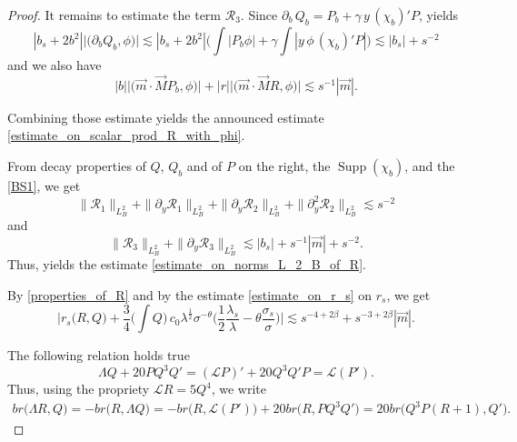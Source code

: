 \documentclass[16pt,english, oneside,reqno]{smfart}
\DeclareMathOperator{\supp}{Supp}
\begin{document}
\begin{proof}
It remains to estimate the term $\mathcal{R}_3$. Since $\partial_b \, Q_b = P_b + \gamma \, y \, (\chi_b)' P$, yields
\begin{equation}
    |b_s + 2b^2| \big\lvert \big( \partial_b Q_b, \phi \big) \big\rvert \lesssim |b_s + 2b^2| \Big( \int |P_b \phi|+ \gamma \int |y \,\phi \, (\chi_b)' P| \Big) \lesssim |b_s|+s^{-2}
\end{equation}
and we also have
\begin{equation}
    |b|\big\lvert \big( \vec{m}\cdot\vec{M}P_b, \phi \big)\big\rvert + |r|\big\lvert \big( \vec{m}\cdot\vec{M}R, \phi \big) \big\rvert \lesssim s^{-1}|\vec{m}|.
\end{equation}

Combining those estimate yields the announced estimate \eqref{estimate_on_scalar_prod_R_with_phi}.

\vspace{0.4cm}
From decay properties of $Q$, $Q_b$ and of $P$ on the right, the $\supp(\chi_b)$, and the \eqref{BS1}, we get
\begin{equation}
    \|\mathcal{R}_1\|_{L^2_B} + \|\partial_y \mathcal{R}_1\|_{L^2_B} + \|\partial_y \mathcal{R}_2\|_{L^2_B} + \|\partial^2_y \mathcal{R}_2\|_{L^2_B} \lesssim s^{-2}
\end{equation}
and 
\begin{equation}
    \| \mathcal{R}_3 \|_{L^2_{B}} + \| \partial_y \mathcal{R}_3 \|_{L^2_{B}} \lesssim |b_s| + s^{-1}|\vec{m}| + s^{-2}.
\end{equation}
Thus, yields the estimate \eqref{estimate_on_norms_L_2_B_of_R}.

\vspace{0.4cm}
By \eqref{properties_of_R} and by the estimate \eqref{estimate_on_r_s} on $r_s$, we get 
\begin{equation}
    \Big\lvert r_s\big( R,Q\big) + \frac{3}{4}\Big(\int Q\Big)\, c_0 \lambda^{\frac{1}{2}}\sigma^{-\theta}\Big( \frac{1}{2}\frac{\lambda_s}{\lambda} - \theta \frac{\sigma_s}{\sigma} \Big) \Big\rvert \lesssim s^{-4+2\beta}+s^{-3+2\beta}|\vec{m}|.
\end{equation}

The following relation holds true
\begin{equation}
    \Lambda Q + 20PQ^3Q' = (\mathcal{L}P)' + 20Q^3Q'P = \mathcal{L}(P').
\end{equation}
Thus, using the propriety $\mathcal{L}R = 5Q^4$, we write
\begin{equation}\label{estimate_on_br_scalar_prod_in_proof_scalar_prod_of_R_Q}
    \begin{split}
        br \big( \Lambda R, Q\big) = - br \big( R, \Lambda Q \big) = -br\big( R, \mathcal{L}(P') \big) + 20br \big( R, PQ^3Q' \big) = 20br\big( Q^3 P (R+1), Q' \big).
    \end{split}
\end{equation}



\end{proof}
\end{document}
